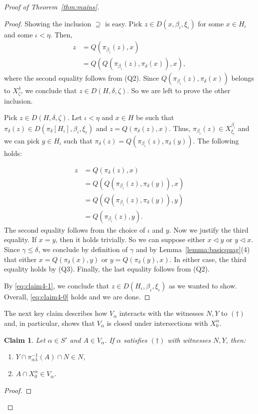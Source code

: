 \documentclass[]{amsart}
\newtheorem{claim}{Claim}[theorem]
\theoremstyle{definition}
\theoremstyle{remark}
\begin{document}
\begin{proof}[Proof of Theorem~\ref{thm:mains}]
\begin{proof}
Showing the inclusion $\supseteq$ is easy. Pick $z \in D(x, \beta_\iota, \xi_\iota )$ for some $x \in H_\iota$ and some $\iota < \eta$. Then,
\begin{align*}
z &= Q(\pi_{\beta_\iota}(z), x) \\&= Q(Q(\pi_{\beta_\iota}(z), \pi_\delta(x)), x),
\end{align*}
where the second equality follows from (Q2). Since $Q(\pi_{\beta_\iota}(z), \pi_\delta(x))$ belongs to $X^\delta_\zeta$, we conclude that $z \in D(H, \delta, \zeta)$. So we are left to prove the other inclusion.

Pick $z \in D(H, \delta, \zeta)$. Let $\iota < \eta$ and $x \in H$ be such that $\pi_\delta(z) \in D(\pi_\delta[H_\iota], \beta_\iota, \xi_\iota)$ and $z = Q(\pi_\delta(z), x)$. Thus, $\pi_{\beta_\iota}(z) \in X^{\beta_\iota}_{\xi_\iota}$ and we can pick $y \in H_\iota$ such that $\pi_\delta(z) = Q(\pi_{\beta_\iota}(z), \pi_\delta(y))$. The following holds:

\begin{equation}\label{eq:claim4-1}
\begin{split}
z &= Q(\pi_\delta(z), x)\\ &= Q(Q(\pi_{\beta_\iota}(z), \pi_\delta(y)), x)\\
&= Q(Q(\pi_{\beta_\iota}(z), \pi_\delta(y)), y)\\
&= Q(\pi_{\beta_\iota}(z), y).
\end{split}
\end{equation}
The second equality follows from the choice of $\iota$ and $y$. Now we justify the third equality. If $x = y$, then it holds trivially. So we can suppose either $x \lhd y$ or $y \lhd x$. Since $\gamma \le \delta$, we conclude by definition of $\gamma$ and by Lemma~\ref{lemma:basicquag}(4) that either $x = Q(\pi_\delta(x), y)$ or $y = Q(\pi_\delta(y),x)$. In either case, the third equality holds by (Q3). Finally, the last equality follows from (Q2). 

By \eqref{eq:claim4-1}, we conclude that $z \in D(H_\iota, \beta_\iota, \xi_\iota)$ as we wanted to show. Overall, \eqref{eq:claim4-0} holds and we are done.
\end{proof}


The next key claim describes how $V_\alpha$ interacts with the witnesses $N, Y$ to $(\dagger)$ and, in particular, shows that $V_\alpha$ is closed under intersections with $X^\alpha_0$.


\begin{claim}\label{claim:5}
Let $\alpha \in S'$ and $A \in V_\alpha$. If $\alpha$ satisfies $(\dagger)$ with witnesses $N, Y$, then:
\begin{enumerate}[label={\upshape (\arabic*)}]
\item $Y \cap \pi_{\alpha \lambda}^{-1}(A) \cap N \in N$,
\item $A \cap X^\alpha_0 \in V_\alpha$.
\end{enumerate}
\end{claim}
\begin{proof}


\end{proof}
\end{proof}
\end{document}
